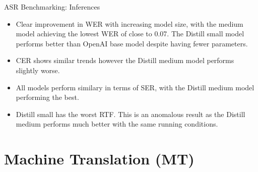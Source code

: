 \documentclass{beamer}
\begin{document}
\begin{frame}{ASR Benchmarking: Inferences}
\begin{itemize}
\item Clear improvement in WER with increasing model size, with the medium model achieving the lowest WER of close to 0.07. The Distill small model performs better than OpenAI base model despite having fewer parameters.
\item CER shows similar trends however the Distill medium model performs slightly worse.
\item All models perform similary in terms of SER, with the Distill medium model performing the best.
\item Distill small has the worst RTF. This is an anomalous result as the Distill medium performs much better with the same running conditions. 
\end{itemize}
\end{frame}

\section{Machine Translation (MT)}
\end{document}
